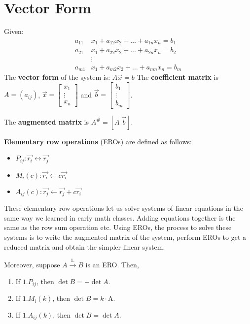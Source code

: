 \documentclass[../main.tex]{subfiles}
\begin{document}
\section{Vector Form}

Given:
\begin{align*}
    a_{11}&x_1 + a_{12}x_2 + \dots + a_{1n}x_n = b_1 \\
    a_{21}&x_1 + a_{22}x_2 + \dots + a_{2n}x_n = b_2 \\
    & \vdots \\
    a_{m1}&x_1 + a_{m2}x_2 + \dots + a_{mn}x_n = b_m
\end{align*}
The \textbf{vector form} of the system is: \( A \vec{x} = b \)
The \textbf{coefficient matrix} is \( A = \left( a_{ij} \right) \),
\( \vec{x} = \begin{bmatrix}
    x_1 \\
    \vdots \\
    x_n
\end{bmatrix} \)
and 
\( \vec{b} = \begin{bmatrix}
    b_1 \\
    \vdots \\
    b_m
\end{bmatrix} \).

The \textbf{augmented matrix} is \( A^\# = \left[ A \; \vec{b}\right]\).

\begin{definition}
    \textbf{Elementary row operations} (EROs) are defined as follows:
    \begin{itemize}
        \item \( P_{ij}: \vec{r_i} \leftrightarrow \vec{r_j} \)
        \item \( M_i(c): \vec{r_i} \leftarrow c \vec{r_i} \)
        \item \( A_{ij}(c): \vec{r_j} \leftarrow \vec{r_j} + c\vec{r_i} \)
    \end{itemize}
\end{definition}

These elementary row operations let us solve systems of linear equations in the same way we learned in early math classes.
Adding equations together is the same as the row sum operation etc.
Using EROs, the process to solve these systems is to write the augmented matrix of the system,
perform EROs to get a reduced matrix and obtain the simpler linear system.

\label{prop_of_det_2} Moreover, suppose \( A \xrightarrow{1.} B \) is an ERO. Then,
\begin{enumerate}
    \item If \( 1. P_{ij} \), then \( \det B = -\det A \).
    \item If \( 1. M_i(k) \), then \( \det B = k\cdot\text{A} \).
    \item If \( 1. A_{ij}(k) \), then \( \det B = \det A \).
\end{enumerate}
\end{document}
